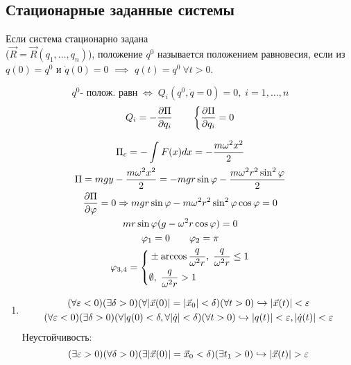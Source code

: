 \documentclass{article}
\begin{document}
\subsection{Стационарные заданные системы}
\begin{definition}
  Если система стационарно задана \\ 
  ($\vec{R}=\vec{R}(q_1,\dots ,q_n)$),
  положение $q^{0}$ называется положением равновесия,
  если из $q(0)=q^{0}$ и $\dot{q}(0) = 0$ $\implies$ $q(t)=q^{0} \ \forall t>0$.
\end{definition}
\begin{theorem}
  \[
    q^{0} \text{- полож. равн} \; \Leftrightarrow \; Q_i(q^{0},\dot{q}=0)=0, \; i=1,\dots ,n
  \]
  \[
    Q_i=-\frac{\partial{\Pi}}{\partial{q_i}} \qquad \left\{\begin{aligned}
      \frac{\partial{\Pi}}{\partial{q_i}}=0
    \end{aligned}\right.
  \]
\end{theorem}
\begin{eg}

  
  \begin{gather*}
    \Pi_{c}=-\int_{}^{}F(x)dx=-\frac{m\omega^{2}x^{2}}{2} \\ 
    \Pi = mgy - \frac{m\omega^{2}x^{2}}{2}=-mgr\sin \varphi - \frac{m\omega^{2}r^{2}\sin^{2}\varphi}{2} \\ 
    \frac{\partial{\Pi}}{\partial{\varphi}}=0 \Rightarrow mgr\sin\varphi - m\omega^{2}r^{2}\sin^{2}\varphi\cos\varphi =0 \\
    mr\sin\varphi(g-\omega^{2}r\cos \varphi)=0 \\ 
    \varphi_1 = 0 \qquad \varphi_2=\pi \\ 
    \varphi_{3,4}= \left\{\begin{aligned}
      & \pm \arccos \frac{q}{\omega^{2}r}, \; \frac{q}{\omega^{2}r} \le 1 \\ 
      & \emptyset, \; \frac{q}{\omega^{2}r}>1
    \end{aligned}\right.
  \end{gather*}
\end{eg}
\begin{definition}
  \begin{enumerate}
    \item
    \begin{gather*}
        (\forall \varepsilon<0)(\exists \delta>0)(\forall|\vec{x}(0)|=|\vec{x}_0|<\delta)(\forall t>0)\hookrightarrow |\vec{x}(t)|<\varepsilon \\
        (\forall \varepsilon<0)(\exists \delta>0)(\forall|q(0)<\delta, \forall |\dot{q}|<\delta)(\forall t>0) \hookrightarrow |q(t)|<\varepsilon, |\dot{q}(t)|<\varepsilon\\
    \end{gather*}
    Неустойчивость:
    \[
      (\exists \epsilon>0)(\forall \delta>0)(\exists|\vec{x}(0)|=\vec{x}_0<\delta)(\exists t_1>0)\true |\vec{x}(t)|>\epsilon
    \]
  \end{enumerate}
\end{definition}
  
\end{document}

